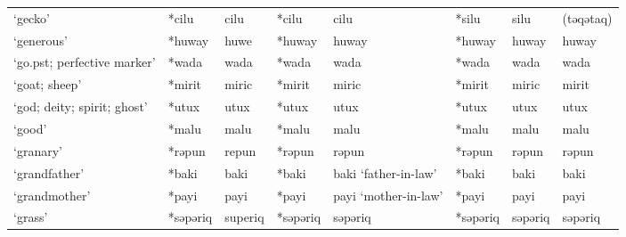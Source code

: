 \begin{landscape}
\begin{longtable}[c]{@{}p{3cm}<{\raggedright}p{2.75cm}<{\raggedright}p{2.75cm}<{\raggedright}p{2.75cm}<{\raggedright}p{2.75cm}<{\raggedright}p{2.75cm}<{\raggedright}p{2.75cm}<{\raggedright}p{2.75cm}<{\raggedright}@{}}
`gecko'                                              & *cilu              & cilu                           & *cilu              & cilu                       & *silu            & silu                     & (təqətaq)                         \\
`generous'                                           & *huway             & huwe                           & *huway             & huway                      & *huway           & huway                    & huway                             \\
`go.pst; perfective marker'                          & *wada              & wada                           & *wada              & wada                       & *wada            & wada                     & wada                              \\
`goat; sheep'                                        & *mirit             & miric                          & *mirit             & miric                      & *mirit           & miric                    & mirit                             \\
`god; deity; spirit; ghost'                          & *utux              & utux                           & *utux              & utux                       & *utux            & utux                     & utux                              \\
`good'                                               & *malu              & malu                           & *malu              & malu                       & *malu            & malu                     & malu                              \\
`granary'                                            & *rəpun             & repun                          & *rəpun             & rəpun                      & *rəpun           & rəpun                    & rəpun                             \\
`grandfather'                                        & *baki              & baki                           & *baki              & baki `father-in-law'       & *baki            & baki                     & baki                              \\
`grandmother'                                        & *payi              & payi                           & *payi              & payi `mother-in-law'       & *payi            & payi                     & payi                              \\
`grass'                                              & *səpəriq           & superiq                        & *səpəriq           & səpəriq                    & *səpəriq         & səpəriq                  & səpəriq                           \\

\end{longtable}
\end{landscape}
